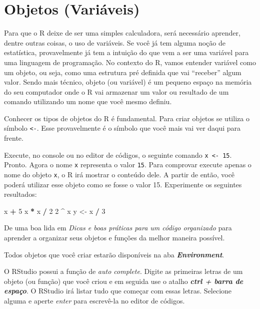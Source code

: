 \documentclass[]{book}
\newenvironment{Shaded}{\begin{snugshade}}{\end{snugshade}}
\newcommand{\DecValTok}[1]{\textcolor[rgb]{0.00,0.00,0.81}{#1}}
\newcommand{\StringTok}[1]{\textcolor[rgb]{0.31,0.60,0.02}{#1}}
\newcommand{\OperatorTok}[1]{\textcolor[rgb]{0.81,0.36,0.00}{\textbf{#1}}}
\newcommand{\NormalTok}[1]{#1}
\begin{document}
\section{Objetos (Variáveis)}\label{objetos-variaveis}

Para que o R deixe de ser uma simples calculadora, será necessário
aprender, dentre outras coisas, o uso de variáveis. Se você já tem
alguma noção de estatística, provavelmente já tem a intuição do que vem
a ser uma variável para uma linguagem de programação. No contexto do R,
vamos entender variável como um objeto, ou seja, como uma estrutura pré
definida que vai ``receber'' algum valor. Sendo mais técnico, objeto (ou
variável) é um pequeno espaço na memória do seu computador onde o R vai
armazenar um valor ou resultado de um comando utilizando um nome que
você mesmo definiu.

Conhecer os tipos de objetos do R é fundamental. Para criar objetos se
utiliza o símbolo \texttt{\textless{}-}. Esse provavelmente é o símbolo
que você mais vai ver daqui para frente.

Execute, no console ou no editor de códigos, o seguinte comando
\texttt{x\ \textless{}-\ 15}. Pronto. Agora o nome \texttt{x} representa
o valor \texttt{15}. Para comprovar execute apenas o nome do objeto
\texttt{x}, o R irá mostrar o conteúdo dele. A partir de então, você
poderá utilizar esse objeto como se fosse o valor 15. Experimente os
seguintes resultados:

\begin{Shaded}
\begin{Highlighting}[]
\NormalTok{x }\OperatorTok{+}\StringTok{ }\DecValTok{5}
\NormalTok{x }\OperatorTok{*}\StringTok{ }\NormalTok{x }\OperatorTok{/}\StringTok{ }\DecValTok{2}
\DecValTok{2} \OperatorTok{^}\StringTok{ }\NormalTok{x}
\NormalTok{y <-}\StringTok{ }\NormalTok{x }\OperatorTok{/}\StringTok{ }\DecValTok{3}
\end{Highlighting}
\end{Shaded}

De uma boa lida em \emph{Dicas e boas práticas para um código
organizado} para aprender a organizar seus objetos e funções da melhor
maneira possível.

Todos objetos que você criar estarão disponíveis na aba
\textbf{\emph{Environment}}.

O RStudio possui a função de \emph{auto complete}. Digite as primeiras
letras de um objeto (ou função) que você criou e em seguida use o atalho
\textbf{\emph{ctrl + barra de espaço}}. O RStudio irá listar tudo que
começar com essas letras. Selecione alguma e aperte \emph{enter} para
escrevê-la no editor de códigos.
\end{document}
